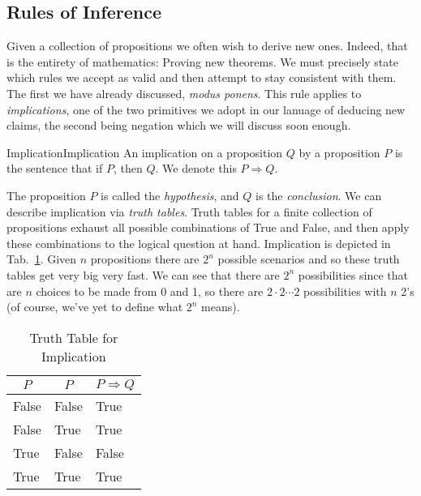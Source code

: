    \subsection{Rules of Inference}
        Given a collection of propositions we often wish to derive new ones.
        Indeed, that is the entirety of mathematics: Proving new theorems. We
        must precisely state which rules we accept as valid and then attempt to
        stay consistent with them. The first we have already discussed,
        \textit{modus ponens}. This rule applies to \textit{implications}, one
        of the two primitives we adopt in our lanuage of deducing new claims,
        the second being negation which we will discuss soon enough.
        \begin{fdefinition}{Implication}{Implication}
            An \gls{implication} on a \gls{proposition} $Q$ by a proposition $P$
            is the sentence that if $P$, then $Q$. We denote this
            $P\Rightarrow{Q}$.
        \end{fdefinition}
        The proposition $P$ is called the \textit{hypothesis},
        and $Q$ is the \textit{conclusion}. We can describe
        implication via \textit{truth tables}. Truth tables
        for a finite collection of propositions exhaust all possible
        combinations of True and False, and then apply these combinations to the
        logical question at hand. Implication is depicted in
        Tab.~\ref{tab:Truth_Table_Implication}. Given
        $n$ propositions there are $2^{n}$ possible scenarios and so these truth
        tables get very big very fast. We can see that there are $2^{n}$
        possibilities since that are $n$ choices to be made from 0 and 1, so
        there are $2\cdot{2}\cdots{2}$ possibilities with $n$ 2's
        (of course, we've yet to define what $2^{n}$ means).
        \par
        \begin{minipage}[b]{0.49\textwidth}
            \centering
            \begin{table}[H]
                \centering
                \captionsetup{type=table}
                \begin{tabular}{l|l|l}
                    \multicolumn{1}{c|}{$P$}&\multicolumn{1}{c|}{$P$}&
                    \multicolumn{1}{c}{$P\Rightarrow{Q}$}\\
                    \hline
                    False&False&True\\
                    False&True&True\\
                    True&False&False\\
                    True&True&True
                \end{tabular}
                \caption{Truth Table for Implication}
                \label{tab:Truth_Table_Implication}
            \end{table}
        \end{minipage}\hfill
